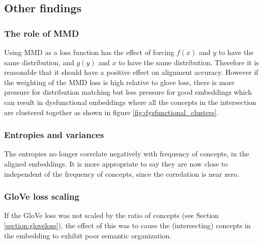 \subsection{Other findings}
\subsubsection{The role of MMD}

Using MMD as a loss function has the effect of forcing $f(x)$ and $y$ to have the same distribution, and  $g(y)$ and $x$ to have the same distribution. Therefore it is reasonable that it should have a positive effect on alignment accuracy. However if the weighting of the MMD loss is high relative to glove loss, there is more pressure for distribution  matching but less pressure for good embeddings which can result in dysfunctional embeddings where all the concepts in the intersection are clustered together as shown in figure \ref{fig:dysfunctional_clusters}. 

\subsubsection{Entropies and variances}

The entropies no longer correlate negatively with frequency of concepts, in the aligned embeddings. It is more appropriate to say they are now close to independent of the frequency of concepts, since the correlation is near zero. 

\subsubsection{GloVe loss scaling}
If the GloVe loss was not scaled by the ratio of concepts (see Section \ref{section:gloveloss}), the effect of this was to cause the (intersecting) concepts in the embedding to exhibit poor semantic organization.



